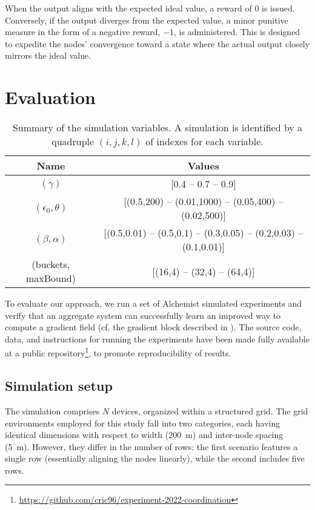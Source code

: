 When the output aligns with the expected ideal value, a reward of $0$ is issued. Conversely, if the output diverges from the expected value, 
 a minor punitive measure in the form of a negative reward, $-1$, is administered. This is designed to expedite the nodes' convergence toward a state where the actual output closely mirrors the ideal value.
\section{Evaluation}\label{coordination2022:s:eval}

\begin{table}[t]
  \centering
  \begin{tabular}{|c|c|}
    \hline
    Name &  Values \\ \hline
    $(\gamma)$ & [0.4 -- 0.7 -- 0.9] \\  \hline
    $(\epsilon_0, \theta)$ & [(0.5,200) -- (0.01,1000) -- (0.05,400) -- (0.02,500)] \\ \hline
    $(\beta, \alpha)$ & [(0.5,0.01) -- (0.5,0.1) -- (0.3,0.05) -- (0.2,0.03) -- (0.1,0.01)]
    \\  \hline
    (buckets, maxBound) & [(16,4) -- (32,4) -- (64,4)]\\ \hline
  \end{tabular}
  \caption{Summary of the simulation variables. 
  A simulation is identified by a quadruple $(i, j, k, l)$ of indexes for each variable. 
  }
  \label{coordination2022:table:parameters}
\end{table}

To evaluate our approach, we run a set of Alchemist simulated experiments and verify that an aggregate system
 can successfully learn an improved way to compute a gradient field (cf. the gradient block described in ).
%
The source code, data, and instructions for running the experiments have been made fully available at a public repository\footnote{\url{https://github.com/cric96/experiment-2022-coordination}}, to promote reproducibility of results.

\subsection{Simulation setup}

The simulation comprises $N$ devices, 
 organized within a structured grid. 
 The grid environments employed for this study fall into two categories, 
 each having identical dimensions with respect to width (\SI{200}{\metre}) and inter-node spacing (\SI{5}{\metre}). 
 However, they differ in the number of rows: 
 the first scenario features a single row (essentially aligning the nodes linearly), while the second includes five rows.


